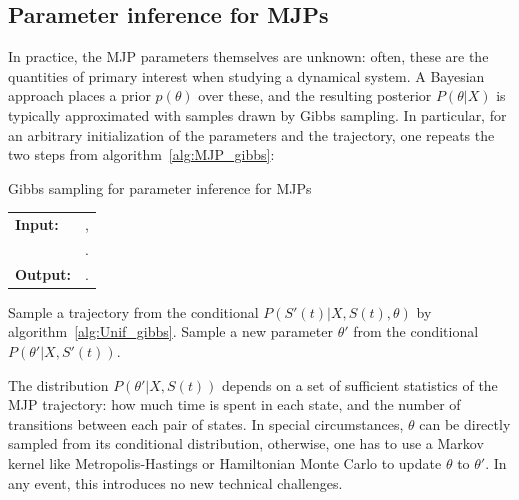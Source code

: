 \subsection{Parameter inference for MJPs}
In practice, the MJP parameters themselves are unknown: often,
these are the quantities of primary interest when studying a dynamical
system. A Bayesian approach
places a prior $p(\theta)$ over these, and the
resulting posterior $P(\theta|X)$ is typically approximated
with samples drawn by Gibbs sampling. In particular, for an arbitrary 
initialization of the parameters and the trajectory, one repeats the
two steps from algorithm~\ref{alg:MJP_gibbs}:
\begin{algorithm}[H]
  \caption{Gibbs sampling for parameter inference for MJPs}
   \label{alg:MJP_gibbs}
  \begin{tabular}{l l}
   \textbf{Input:  } & \text{A set of partial and noisy observations $X$}, \\
                      & \text{The previous MJP path $S(t) = (S, T)$, the previous MJP parameters $\theta$}.\\ 
   \textbf{Output:  }& \text{A new MJP trajectory $S' (t) = (S', T')$, 
                            new MJP parameters $\theta'$}.\\
   \hline
   \end{tabular}
   \begin{algorithmic}[1]
  \State  Sample a trajectory from the conditional 
  $P(S'(t)|X,S(t),\theta)$ by 
  algorithm~\ref{alg:Unif_gibbs}.
  \State Sample a new parameter $\theta'$ from the conditional 
    $P(\theta'|X,S'(t))$.
   \end{algorithmic}
\end{algorithm} 
\vspace{-.1in}
The distribution $P(\theta'|X,S(t))$ depends on a set of sufficient statistics of the 
MJP trajectory: how
much time is spent in each state, and the number of transitions
between each pair of states. 
In special circumstances, $\theta$ can be directly sampled from its 
conditional distribution, otherwise, one has to use a Markov kernel like
Metropolis-Hastings or Hamiltonian Monte Carlo to update $\theta$ to 
$\theta'$. In any event, this introduces no new technical challenges.
